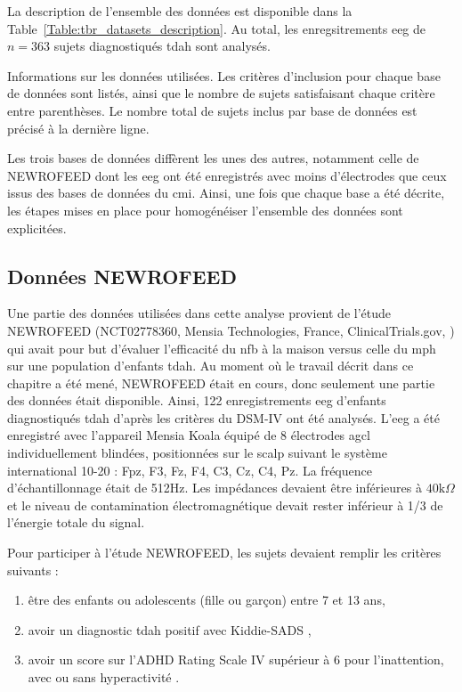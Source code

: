 La description de l'ensemble des données est disponible dans la Table~\ref{Table:tbr_datasets_description}. Au total, les enregsitrements \gls{eeg} de 
$n = 363$ sujets diagnostiqués \gls{tdah} sont analysés.

\begin{table}[h!]
  \centering
  \caption{Informations sur les données utilisées. Les critères d'inclusion pour chaque base de données sont listés, ainsi que le nombre de sujets satisfaisant
	chaque critère entre parenthèses. Le nombre total de sujets inclus par base de données est précisé à la dernière ligne.}
  
  \label{Table:tbr_datasets_description}
\end{table}

Les trois bases de données diffèrent les unes des autres, notamment celle de NEWROFEED dont les \gls{eeg} ont été enregistrés avec moins d'électrodes 
que ceux issus des bases de données du \gls{cmi}. Ainsi, une fois que chaque base a été décrite, les étapes
mises en place pour homogénéiser l'ensemble des données sont explicitées.

\subsection{Données NEWROFEED}

Une partie des données utilisées dans cette analyse provient de l'étude NEWROFEED (NCT02778360, Mensia Technologies, France, ClinicalTrials.gov, \citet{Bioulac2019})
qui avait pour but d'évaluer l'efficacité du \gls{nfb} à la maison versus celle du \gls{mph} sur une population d'enfants \gls{tdah}.
Au moment où le travail décrit dans ce chapitre a été mené, NEWROFEED était en cours, donc 
seulement une partie des données était disponible. Ainsi, 122 enregistrements \gls{eeg} d'enfants diagnostiqués \gls{tdah} d'après les critères du DSM-IV \citep{DSM-4} 
ont été analysés. L'\gls{eeg} a été enregistré avec l'appareil Mensia Koala équipé de 8 électrodes \gls{agcl} individuellement blindées, positionnées sur le scalp suivant
le système international 10-20 : Fpz, F3, Fz, F4, C3, Cz, C4, Pz. La fréquence d'échantillonnage était de 512Hz. Les impédances devaient être
inférieures à $40\text{k}\Omega$ et le niveau de contamination électromagnétique devait rester inférieur à 1/3 de l'énergie totale du signal. 

Pour participer à l'étude NEWROFEED, les sujets devaient remplir les critères suivants :
\begin{enumerate}
\item être des enfants ou adolescents (fille ou garçon) entre 7 et 13 ans,
\item avoir un diagnostic \gls{tdah} positif avec Kiddie-SADS \citep{Kaufman1997},
\item avoir un score sur l'ADHD Rating Scale IV supérieur à 6 pour l'inattention, avec ou sans hyperactivité \citep{Pappas2006}.
\end{enumerate}

